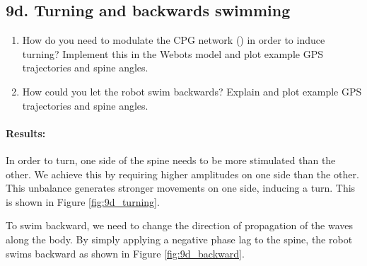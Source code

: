 \documentclass{cmc}
\begin{document}
\subsection*{9d. Turning and backwards swimming}
\label{sec:turning-backwards}

\begin{enumerate}
\item How do you need to modulate the CPG network ()
  in order to induce turning?  Implement this in the Webots model and
  plot example GPS trajectories and spine angles.
\item How could you let the robot swim backwards? Explain and plot
  example GPS trajectories and spine angles.
\end{enumerate}

\paragraph{Results:}
In order to turn, one side of the spine needs to be more stimulated than the other. We achieve this by requiring higher amplitudes on one side than the other. This unbalance generates stronger movements on one side, inducing a turn. This is shown in Figure \ref{fig:9d_turning}. 

To swim backward, we need to change the direction of propagation of the waves along the body. By simply applying a negative phase lag to the spine, the robot swims backward as shown in Figure \ref{fig:9d_backward}.
\end{document}
